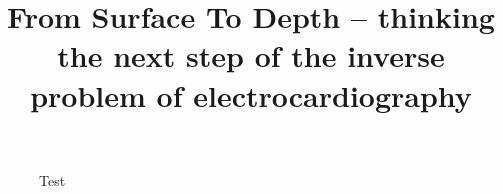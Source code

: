 \documentclass[10pt]{scrartcl}
\title{From Surface To Depth -- thinking the next step of the inverse problem of electrocardiography}
\begin{document}
\begin{figure}[ht]
    \center
    
	\caption{Test}
	\label{fig:test}
\end{figure}
\end{document}
